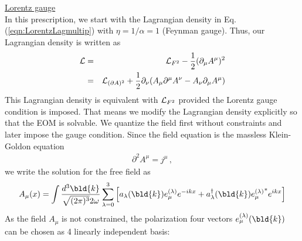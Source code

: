 \bigskip

\noindent
\underline{Lorentz gauge}\\
In this prescription, we start with the Lagrangian density in Eq. (\ref{eqn:LorentzLagmultip})
with $\eta = 1/ \alpha = 1$ (Feynman gauge). Thus, our Lagrangian density is written as
\begin{eqnarray}
{\cal L}
&=&
{\cal L}_{F^2} - \frac{1}{2}(\partial_\mu A^\mu)^2
\nonumber\\
&=&
{\cal L}_{(\partial A)^2} 
+ \frac{1}{2}
\partial_\nu (
A_\mu \partial^\mu A^\nu
-
A_\nu \partial_\mu A^\mu
)
\label{eqn:LorQFermiLag}
\end{eqnarray}
This Lagrangian density is equivalent with ${\cal L}_{F^2}$ provided
the Lorentz gauge condition is imposed. That means we modify the 
Lagrangian density explicitly so that the EOM is solvable.
We quantize the field first without constraints and later impose
the gauge condition.
Since the field equation is the massless Klein-Goldon equation
\begin{eqnarray}
\partial^2 A^\mu = j^\mu
\,,
\end{eqnarray}
we write the solution for the free field as
\begin{eqnarray}
A_\mu (x)
=
\int
\frac{d^3 \bld{k}}
{\sqrt{(2\pi)^3} 2\omega}
\sum_{\lambda = 0}^3
\left[
a_\lambda (\bld{k})
e_\mu^{(\lambda)} e^{-ikx}
+
a^\dagger_\lambda (\bld{k})
{e_\mu^{(\lambda)}}^* e^{ikx}
\right]
\label{eqn:photonFieldExpansionLorentz}
\end{eqnarray}
As the field $A_\mu$ is not constrained, the polarization four vectors $e_\mu^{(\lambda)}(\bld{k})$ 
can be chosen as 4 linearly independent basis:
\begin{comment}
\begin{eqnarray}
\begin{array}{l}
\sum_{\mu = 0}^3 e_\mu^{(\lambda)} e_\mu^{(\lambda')} 
=
\delta^{\lambda \lambda'}
\vspace{2mm}
\\
\sum_{\lambda=0}^3
e_\mu^{(\lambda)} e_\nu^{(\lambda)} 
=
\delta_{\mu \nu}
\hspace{5mm}
\mbox{completeness}
\vspace{2mm}
\\
e_\mu^{(\lambda)} e^{(\lambda')\mu}
= g^{\lambda \lambda'} 
\hspace{5mm}
\mbox{orthonormality}
\end{array}
\end{eqnarray}
\begin{eqnarray}
\sum_{\lambda=0}^3
\frac{ e_\mu^{(\lambda)} {e_\nu^{(\lambda)}}^* }
{e^{(\lambda)} \cdot {e^{(\lambda)}}^* }
= g_{\mu \nu}
\,,
\hspace{5mm}
e^{(\lambda)} \cdot {e^{(\lambda')}}^* 
=
g^{\lambda \lambda'}
\end{eqnarray}
\end{comment}
